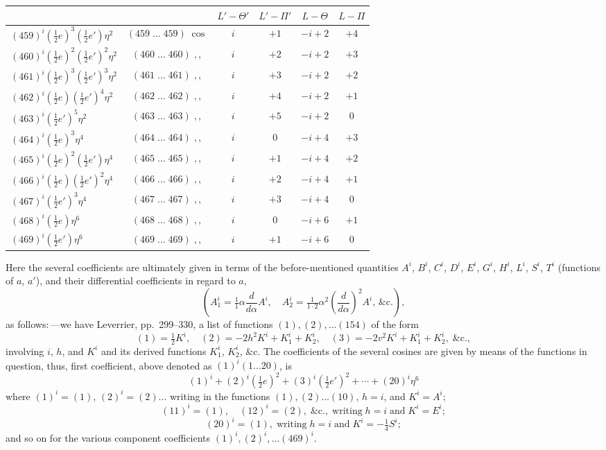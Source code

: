 \documentclass[11pt]{article}
\begin{document}
\begin{center}
\begin{tabular}{|l|c|c|c|c|c|}
\hline
 & & $L'-\Theta'$ & $L'-\Pi'$ & $L-\Theta$ & $L-\Pi$ \\
\hline
$(459)^i(\tfrac{1}{2}e)^3(\tfrac{1}{2}e')\eta^2$ & $(459\;\ldots\;459)\;\cos$ & $i$ & $+1$ & $-i+2$ & $+4$ \\
$(460)^i(\tfrac{1}{2}e)^2(\tfrac{1}{2}e')^2\eta^2$ & $(460\;\ldots\;460)\;,,$ & $i$ & $+2$ & $-i+2$ & $+3$ \\
$(461)^i(\tfrac{1}{2}e)^3(\tfrac{1}{2}e')^3\eta^2$ & $(461\;\ldots\;461)\;,,$ & $i$ & $+3$ & $-i+2$ & $+2$ \\
$(462)^i(\tfrac{1}{2}e)(\tfrac{1}{2}e')^4\eta^2$ & $(462\;\ldots\;462)\;,,$ & $i$ & $+4$ & $-i+2$ & $+1$ \\
$(463)^i(\tfrac{1}{2}e')^5\eta^2$ & $(463\;\ldots\;463)\;,,$ & $i$ & $+5$ & $-i+2$ & $0$ \\
$(464)^i(\tfrac{1}{2}e)^3\eta^4$ & $(464\;\ldots\;464)\;,,$ & $i$ & $0$ & $-i+4$ & $+3$ \\
$(465)^i(\tfrac{1}{2}e)^2(\tfrac{1}{2}e')\eta^4$ & $(465\;\ldots\;465)\;,,$ & $i$ & $+1$ & $-i+4$ & $+2$ \\
$(466)^i(\tfrac{1}{2}e)(\tfrac{1}{2}e')^2\eta^4$ & $(466\;\ldots\;466)\;,,$ & $i$ & $+2$ & $-i+4$ & $+1$ \\
$(467)^i(\tfrac{1}{2}e')^3\eta^4$ & $(467\;\ldots\;467)\;,,$ & $i$ & $+3$ & $-i+4$ & $0$ \\
$(468)^i(\tfrac{1}{2}e)\eta^6$ & $(468\;\ldots\;468)\;,,$ & $i$ & $0$ & $-i+6$ & $+1$ \\
$(469)^i(\tfrac{1}{2}e')\eta^6$ & $(469\;\ldots\;469)\;,,$ & $i$ & $+1$ & $-i+6$ & $0$ \\
\hline
\end{tabular}
\end{center}

\medskip

Here the several coefficients are ultimately given in terms of the
before-mentioned quantities $A^i$, $B^i$, $C^i$, $D^i$, $E^i$, $G^i$,
$H^i$, $L^i$, $S^i$, $T^i$ (functions of $a$, $a'$), and their
differential coefficients in regard to $a$,
\[
\left(A_1^i=\tfrac{1}{1}\alpha\frac{d}{d\alpha}A^i,\quad A_2^i=\tfrac{1}{1\cdot2}\alpha^2\left(\frac{d}{d\alpha}\right)^2A^i,\,\&\mathrm{c}.\right),
\]
as follows:\,---we have Leverrier, pp.~299--330, a list of functions
$(1),(2),\ldots(154)$ of the form
\[
(1)=\tfrac{1}{2}K^i,\quad(2)=-2h^2K^i+K_1^i+K_2^i,\quad(3)=-2v^2K^i+K_1^i+K_2^i,\;\&\mathrm{c}.,
\]
involving $i$, $h$, and $K^i$ and its derived functions $K_1^i$, $K_2^i$,
\&c. The coefficients of the several cosines are given by means of the
functions in question, thus, first coefficient, above denoted as
$(1)^i(1\ldots20)$, is
\[
(1)^i+(2)^i(\tfrac{1}{2}e)^2+(3)^i(\tfrac{1}{2}e')^2+\cdots+(20)^i\eta^6
\]
where $(1)^i=(1)$, $(2)^i=(2)\ldots$ writing in the functions $(1),(2)\ldots(10)$, $h=i$, and $K^i=A^i$;
\[
(11)^i=(1),\quad(12)^i=(2),\;\&\mathrm{c}.,\;\text{writing}\;h=i\;\text{and}\;K^i=E^i;
\]
\[
(20)^i=(1),\;\text{writing}\;h=i\;\text{and}\;K^i=-\tfrac{1}{4}S^i;
\]
and so on for the various component coefficients $(1)^i,(2)^i,\ldots(469)^i$.
\end{document}
